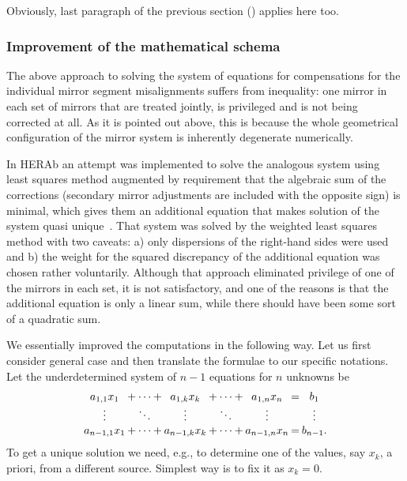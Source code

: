 Obviously, last paragraph of the previous section ()
applies here too.


\subsubsection{Improvement of the mathematical schema}

The above approach to solving the system of equations for compensations for the
individual mirror segment misalignments suffers from inequality: one mirror in
each set of mirrors that are treated jointly, is privileged and is not being
corrected at all. As it is pointed out above, this is because the whole
geometrical configuration of the mirror system is inherently degenerate
numerically.

In HERAb an attempt was implemented to solve the analogous system using least
squares method augmented by requirement that the algebraic sum of the
corrections (secondary mirror adjustments are included with the opposite sign)
is minimal, which gives them an additional equation that makes solution of the
system quasi unique~\cite{Staric:2007vf}. That system was solved by the weighted
least squares method with two caveats: a) only dispersions of the right-hand
sides were used and b) the weight for the squared discrepancy of the additional
equation was chosen rather voluntarily. Although that approach eliminated
privilege of one of the mirrors in each set, it is not satisfactory, and one of
the reasons is that the additional equation is only a linear sum, while there
should have been some sort of a quadratic sum.

We essentially improved the computations in the following way. Let us first
consider general case and then translate the formulae to our specific notations.
Let the underdetermined system of $n-1$ equations for $n$ unknowns be
\begin{equation}
  \label{eq:GenericSystem}
  \arraycolsep=1pt
  \begin{array}{*{11}c}
     a_{1,1}x_1    &+& \cdots   &+& a_{1,k}x_k     &+& \cdots  &+& a_{1,n}x_n   &=& b_1        \\
     \vdots        & & \ddots   & & \vdots         & & \ddots  & & \vdots       & & \vdots     \\
     a_{n-1,1}x_1  &+& \cdots   &+& a_{n-1,k}x_k   &+& \cdots  &+& a_{n-1,n}x_n &=& b_{n-1}.
  \end{array}
\end{equation}
To get a unique solution we need, e.g., to determine one of the values, say
$x_k$, a priori, from a different source. Simplest way is to fix it as $x_k=0$.

